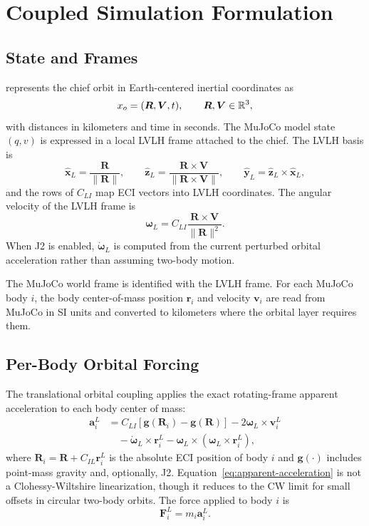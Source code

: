 \section{Coupled Simulation Formulation}
\label{sec:formulation}

\subsection{State and Frames}

\mjorbit{} represents the chief orbit in Earth-centered inertial coordinates
as
\begin{equation}
  x_o = (\bm R,\bm V,t), \qquad \bm R,\bm V \in \mathbb{R}^3,
\end{equation}
with distances in kilometers and time in seconds. The MuJoCo model state
$(q,v)$ is expressed in a local LVLH frame attached to the chief. The LVLH
basis is
\begin{equation}
  \hat{\bm x}_L = \frac{\bm R}{\|\bm R\|}, \qquad
  \hat{\bm z}_L = \frac{\bm R \times \bm V}{\|\bm R \times \bm V\|}, \qquad
  \hat{\bm y}_L = \hat{\bm z}_L \times \hat{\bm x}_L ,
\end{equation}
and the rows of $C_{LI}$ map ECI vectors into LVLH coordinates. The angular
velocity of the LVLH frame is
\begin{equation}
  \bm\omega_L = C_{LI}\frac{\bm R \times \bm V}{\|\bm R\|^2}.
\end{equation}
When J2 is enabled, $\dot{\bm\omega}_L$ is computed from the current
perturbed orbital acceleration rather than assuming two-body motion.

The MuJoCo world frame is identified with the LVLH frame. For each MuJoCo
body $i$, the body center-of-mass position $\bm r_i$ and velocity
$\bm v_i$ are read from MuJoCo in SI units and converted to kilometers where
the orbital layer requires them.

\subsection{Per-Body Orbital Forcing}

The translational orbital coupling applies the exact rotating-frame apparent
acceleration to each body center of mass:
\begin{align}
  \bm a_i^L
    &= C_{LI}\left[\bm g(\bm R_i)-\bm g(\bm R)\right]
       -2\bm\omega_L \times \bm v_i^L \nonumber\\
    &\quad -\dot{\bm\omega}_L \times \bm r_i^L
       -\bm\omega_L \times (\bm\omega_L \times \bm r_i^L),
  \label{eq:apparent-acceleration}
\end{align}
where $\bm R_i = \bm R + C_{IL}\bm r_i^L$ is the absolute ECI position of
body $i$ and $\bm g(\cdot)$ includes point-mass gravity and, optionally, J2.
Equation~\eqref{eq:apparent-acceleration} is not a Clohessy-Wiltshire
linearization, though it reduces to the CW limit for small offsets in
circular two-body orbits. The force applied to body $i$ is
\begin{equation}
  \bm F_i^L = m_i \bm a_i^L .
\end{equation}

